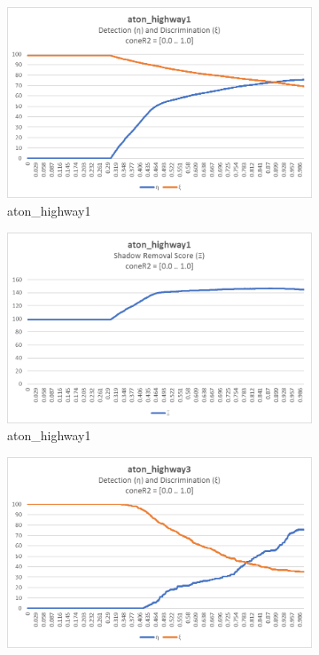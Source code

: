 \begin{appendices}
\begin{figure}
  \begin{subfigure}{.45\linewidth}
  \includegraphics[width=1\linewidth]{figures/appendix/highway1_coneR2_response.jpg}
  \caption{aton\_highway1}
\end{subfigure}
\hfill
\begin{subfigure}{.45\linewidth}
  \includegraphics[width=1\linewidth]{figures/appendix/highway1_coneR2_score.jpg}
  \caption{aton\_highway1}
\end{subfigure}
\hfill
\begin{subfigure}{.45\linewidth}
  \includegraphics[width=1\linewidth]{figures/appendix/highway3_coneR2_response.jpg}

\end{subfigure}
\end{figure}
\end{appendices}
